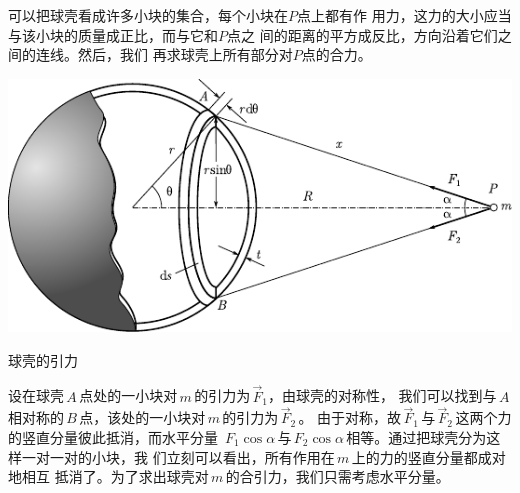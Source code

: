 可以把球壳看成许多小块的集合，每个小块在$ P $点上都有作
用力，这力的大小应当与该小块的质量成正比，而与它和$ P $点之
间的距离的平方成反比，方向沿着它们之间的连线。然后，我们
再求球壳上所有部分对$ P $点的合力。
\begin{figurex}
 \centering
 \includegraphics{figure/fig04.10}
 \caption{球壳的引力}
 \label{fig:04.10}
\end{figurex}\vspace{-0.5em}

设在球壳\,$ A $\,点处的一小块对\,$ m $\,的引力为\,$ \vec{F} _ { 1 } $，由球壳的对称性，
我们可以找到与\,$ A $\,相对称的\,$ B $\,点，该处的一小块对\,$ m $\,的引力为\,$ \vec{F} _ { 2 } $\,。
由于对称，故\,$ \vec{F} _ { 1 } $\,与\,$ \vec{F} _ { 2 } $\,这两个力的竖直分量彼此抵消，而水平分量
\,$ F _ { 1 } \cos \alpha $\,与\,$ F _ { 2 } \cos \alpha $\,相等。通过把球壳分为这样一对一对的小块，我
们立刻可以看出，所有作用在\,$ m $\,上的力的竖直分量都成对地相互
抵消了。为了求出球壳对\,$ m $\,的合引力，我们只需考虑水平分量。

